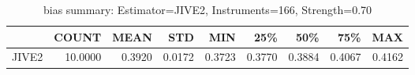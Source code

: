 \begin{table}[ht]
\centering
\caption{bias summary: Estimator=JIVE2, Instruments=166, Strength=0.70}
\begin{tabular}{lrrrrrrrr}
\toprule
 & COUNT & MEAN & STD & MIN & 25\% & 50\% & 75\% & MAX \\
\midrule
JIVE2 & 10.0000 & 0.3920 & 0.0172 & 0.3723 & 0.3770 & 0.3884 & 0.4067 & 0.4162 \\
\bottomrule
\end{tabular}
\end{table}
